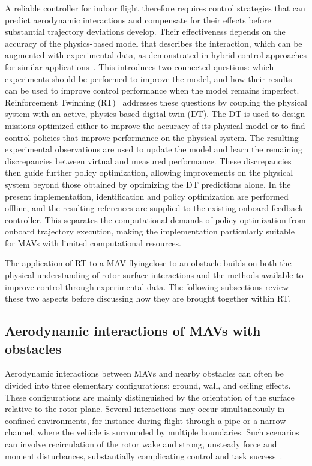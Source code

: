 \documentclass[journal]{IEEEtran}
\begin{document}
A reliable controller for indoor flight therefore requires control strategies that can predict aerodynamic interactions and compensate for their effects before substantial trajectory deviations develop. Their effectiveness depends on the accuracy of the physics-based model that describes the interaction, which can be augmented with experimental data, as demonstrated in hybrid control approaches for similar applications~\cite{LeeSparseGE2025,NeuralFly2022}. This introduces two connected questions: which experiments should be performed to improve the model, and how their results can be used to improve control performance when the model remains imperfect. Reinforcement Twinning (RT)~\cite{SchenaRT2023,Mendez2026} addresses these questions by coupling the physical system with an active, physics-based digital twin (DT). The DT is used to design missions optimized either to improve the accuracy of its physical model or to find control policies that improve performance on the physical system. The resulting experimental observations are used to update the model and learn the remaining discrepancies between virtual and measured performance. These discrepancies then guide further policy optimization, allowing improvements on the physical system beyond those obtained by optimizing the DT predictions alone.
In the present implementation, identification and policy optimization are performed offline, and the resulting references are supplied to the existing onboard feedback controller. This separates the computational demands of policy optimization from onboard trajectory execution, making the implementation particularly suitable for MAVs with limited computational resources.

The application of RT to a MAV flyingclose to an obstacle builds on both the physical understanding of rotor-surface interactions and the methods available to improve control through experimental data. The following subsections review these two aspects before discussing how they are brought together within RT.

\subsection{Aerodynamic interactions of MAVs with obstacles} 
Aerodynamic interactions between MAVs and nearby obstacles can often be divided into three elementary configurations: ground, wall, and ceiling effects. These configurations are mainly distinguished by the orientation of the surface relative to the rotor plane. Several interactions may occur simultaneously in confined environments, for instance during flight through a pipe or a narrow channel, where the vehicle is surrounded by multiple boundaries. Such scenarios can involve recirculation of the rotor wake and strong, unsteady force and moment disturbances, substantially complicating control and task success~\cite{Bauersfeld2026}.
\end{document}
